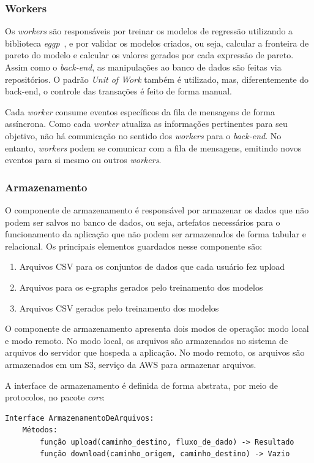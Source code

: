 \subsubsection{Workers}
Os \textit{workers} são responsáveis por treinar os modelos de regressão utilizando a biblioteca \textit{eggp}~\cite{eggp}, e por validar os modelos criados, ou seja, calcular a fronteira de pareto do modelo e calcular os valores gerados por cada expressão de pareto. Assim como o \textit{back-end}, as manipulações ao banco de dados são feitas via repositórios. O padrão \textit{Unit of Work} também é utilizado, mas, diferentemente do back-end, o controle das transações é feito de forma manual.

Cada \textit{worker} consume eventos específicos da fila de mensagens de forma assíncrona. Como cada \textit{worker} atualiza as informações pertinentes para seu objetivo, não há comunicação no sentido dos \textit{workers} para o \textit{back-end}. No entanto, \textit{workers} podem se comunicar com a fila de mensagens, emitindo novos eventos para si mesmo ou outros \textit{workers}.

\subsubsection{Armazenamento}
O componente de armazenamento é responsável por armazenar os dados que não podem ser salvos no banco de dados, ou seja, artefatos necessários para o funcionamento da aplicação que não podem ser armazenados de forma tabular e relacional. Os principais elementos guardados nesse componente são:
\begin{enumerate}
    \item Arquivos CSV para os conjuntos de dados que cada usuário fez upload
    \item Arquivos para os e-graphs gerados pelo treinamento dos modelos
    \item Arquivos CSV gerados pelo treinamento dos modelos
\end{enumerate}

O componente de armazenamento apresenta dois modos de operação: modo local e modo remoto. No modo local, os arquivos são armazenados no sistema de arquivos do servidor que hospeda a aplicação. No modo remoto, os arquivos são armazenados em um S3, serviço da AWS para armazenar arquivos.

A interface de armazenamento é definida de forma abstrata, por meio de protocolos, no pacote \textit{core}:
\begin{lstlisting}[style=pseudocodigo, caption={Definição, em pseudo-código, da interface de armazenamento}]
Interface ArmazenamentoDeArquivos:
    Métodos:
        função upload(caminho_destino, fluxo_de_dado) -> Resultado
        função download(caminho_origem, caminho_destino) -> Vazio
\end{lstlisting}

